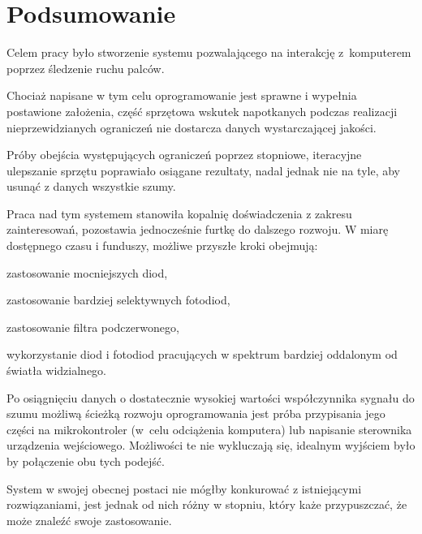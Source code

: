 \chapter{Podsumowanie}\label{ch:summary}

Celem pracy było stworzenie systemu pozwalającego na interakcję z~komputerem poprzez śledzenie ruchu palców.

Chociaż napisane w tym celu oprogramowanie jest sprawne i wypełnia postawione założenia, część sprzętowa wskutek napotkanych podczas realizacji nieprzewidzianych ograniczeń nie dostarcza danych wystarczającej jakości.

Próby obejścia występujących ograniczeń poprzez stopniowe, iteracyjne ulepszanie sprzętu poprawiało osiągane rezultaty, nadal jednak nie na tyle, aby usunąć z danych wszystkie szumy.

Praca nad tym systemem stanowiła kopalnię doświadczenia z zakresu zainteresowań, pozostawia jednocześnie furtkę do dalszego rozwoju.
W miarę dostępnego czasu i funduszy, możliwe przyszłe kroki obejmują:

\begin{aenumerate}
 \item zastosowanie mocniejszych diod,
 \item zastosowanie bardziej selektywnych fotodiod,
 \item zastosowanie filtra podczerwonego,
 \item wykorzystanie diod i fotodiod pracujących w spektrum bardziej oddalonym od światła widzialnego.
\end{aenumerate}

Po osiągnięciu danych o dostatecznie wysokiej wartości współczynnika sygnału do szumu możliwą ścieżką rozwoju oprogramowania jest próba przypisania jego części na mikrokontroler (w~celu odciążenia komputera) lub napisanie sterownika urządzenia wejściowego.
Możliwości te nie wykluczają się, idealnym wyjściem było by połączenie obu tych podejść.

System w swojej obecnej postaci nie mógłby konkurować z istniejącymi rozwiązaniami, jest jednak od nich różny w stopniu, który każe przypuszczać, że może znaleźć swoje zastosowanie.
